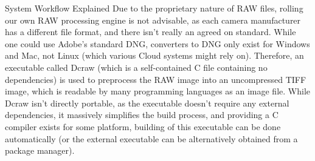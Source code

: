 \documentclass[final]{beamer}
\begin{document}
\begin{frame}{}
\begin{columns}[t]
\begin{column}{.48\linewidth}
\begin{block}{System Workflow Explained}
          Due to the proprietary nature of RAW files, rolling our own RAW processing engine is not
          advisable, as each camera manufacturer has a different file format, and there isn't really
          an agreed on standard. While one could use Adobe's standard DNG, converters to DNG only exist
          for Windows and Mac, not Linux (which various Cloud systems might rely on). Therefore, an
          executable called Dcraw (which is a self-contained C file containing no dependencies) is used
          to preprocess the RAW image into an uncompressed TIFF image, which is readable by many programming
          languages as an image file. While Dcraw isn't directly portable, as the executable doesn't require
          any external dependencies, it massively simplifies the build process, and providing a C compiler exists
          for some platform, building of this executable can be done automatically (or the external executable can be
          alternatively obtained from a package manager). 

        \end{block}

        

      \end{column}
    \end{columns}


  \end{frame}
\end{document}
